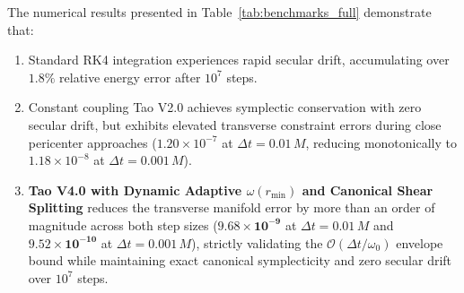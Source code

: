 \documentclass[11pt,a4paper,reqno]{article}
\theoremstyle{plain}
\theoremstyle{definition}
\theoremstyle{remark}
\numberwithin{equation}{section}
\begin{document}
The numerical results presented in Table~\ref{tab:benchmarks_full} demonstrate that:
\begin{enumerate}
    \item Standard RK4 integration experiences rapid secular drift, accumulating over $1.8\%$ relative energy error after $10^7$ steps.
    \item Constant coupling Tao V2.0 achieves symplectic conservation with zero secular drift, but exhibits elevated transverse constraint errors during close pericenter approaches ($1.20 \times 10^{-7}$ at $\Delta t = 0.01 \, M$, reducing monotonically to $1.18 \times 10^{-8}$ at $\Delta t = 0.001 \, M$).
    \item \textbf{Tao V4.0 with Dynamic Adaptive $\omega(r_{\min})$ and Canonical Shear Splitting} reduces the transverse manifold error by more than an order of magnitude across both step sizes ($\mathbf{9.68 \times 10^{-9}}$ at $\Delta t = 0.01 \, M$ and $\mathbf{9.52 \times 10^{-10}}$ at $\Delta t = 0.001 \, M$), strictly validating the $\mathcal{O}(\Delta t / \omega_0)$ envelope bound while maintaining exact canonical symplecticity and zero secular drift over $10^7$ steps.
\end{enumerate}
\end{document}

